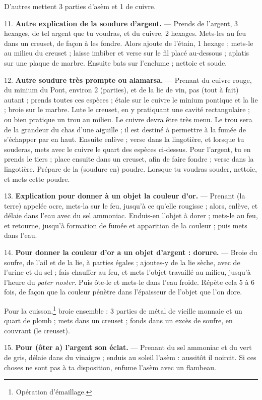 \documentclass[a4paper, 11pt, oneside, polutonikogreek, french]{article}
\begin{document}
D'autres mettent 3 parties d'asèm et 1 de cuivre.

11. \textbf{Autre explication de la soudure d'argent.} --- Prends de l'argent, 3 hexages, de tel argent que tu voudras, et du cuivre, 2 hexages. Mets-les au feu dans un creuset, de façon à les fondre. Alors ajoute de l'étain, 1 hexage ; mets-le au milieu du creuset ; laisse imbiber et verse sur le fil placé au-dessous ; aplatis sur une plaque de marbre. Ensuite bats sur l'enclume ; nettoie et soude.

12. \textbf{Autre soudure très prompte ou alamarsa.} --- Prenant du cuivre rouge, du minium du Pont, environ 2 (parties), et de la lie de vin, pas (tout à fait) autant ; prends toutes ces espèces ; étale sur le cuivre le minium pontique et la lie ; broie sur le marbre. Lute le creuset, en y pratiquant une cavité rectangulaire ; ou bien pratique un trou au milieu. Le cuivre devra être très menu. Le trou sera de la grandeur du chas d'une aiguille ; il est destiné à permettre à la fumée de s'échapper par en haut. Ensuite enlève ; verse dans la lingotière, et lorsque tu souderas, mets avec le cuivre le quart des espèces ci-dessus. Pour l'argent, tu en prends le tiers ; place ensuite dans un creuset, afin de faire fondre ; verse dans la lingotière. Prépare de la (soudure en) poudre. Lorsque tu voudras souder, nettoie, et mets cette poudre.

13. \textbf{Explication pour donner à un objet la couleur d'or.} --- Prenant (la terre) appelée ocre, mets-la sur le feu, jusqu'à ce qu'elle rougisse ; alors, enlève, et délaie dans l'eau avec du sel ammoniac. Enduis-en l'objet à dorer ; mets-le au feu, et retourne, jusqu'à formation de fumée et apparition de la couleur ; puis mets dans l'eau.

14. \textbf{Pour donner la couleur d'or a un objet d'argent : dorure.} --- Broie du soufre, de l'ail et de la lie, à parties égales ; ajoutes-y de la lie sèche, avec de l'urine et du sel ; fais chauffer au feu, et mets l'objet travaillé au milieu, jusqu'à l'heure du \emph{pater noster}. Puis ôte-le et mets-le dans l'eau froide. Répète cela 5 à 6 fois, de façon que la couleur pénètre dans l'épaisseur de l'objet que l'on dore.

Pour la cuisson,\footnote{Opération d'émaillage.} broie ensemble : 3 parties de métal de vieille monnaie et un quart de plomb ; mets dans un creuset ; fonds dans un excès de soufre, en couvrant (le creuset).

15. \textbf{Pour (ôter a) l'argent son éclat.} --- Prenant du sel ammoniac et du vert de gris, délaie dans du vinaigre ; enduis au soleil l'asèm : aussitôt il noircit. Si ces choses ne sont pas à ta disposition, enfume l'asèm avec un flambeau.
\end{document}
